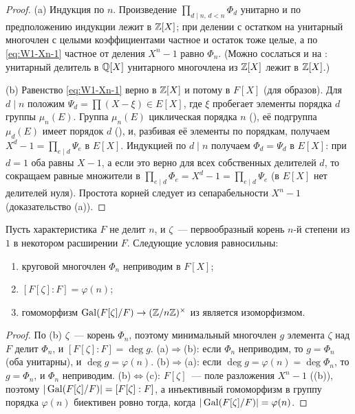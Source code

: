 \begin{proof}
(a) Индукция по $n$. Произведение $\prod_{d\mid n,\,d<n}\Phi_d$ унитарно и по предположению индукции лежит в $\mathbb Z[X]$; при
делении с остатком на унитарный многочлен с целыми коэффициентами частное и остаток тоже целые, а по \eqref{eq:W1-Xn-1}
частное от деления $X^n-1$ равно $\Phi_n$. (Можно сослаться и на : унитарный делитель в $\mathbb Q[X]$ унитарного многочлена из
$\mathbb Z[X]$ лежит в $\mathbb Z[X]$.)

(b) Равенство \eqref{eq:W1-Xn-1} верно в $\mathbb Z[X]$ и потому в $F[X]$ (для образов). Для $d\mid n$ положим
$\Psi_d=\prod(X-\xi)\in E[X]$, где $\xi$ пробегает элементы порядка $d$ группы $\mu_n(E)$. Группа $\mu_n(E)$ циклическая
порядка $n$ (), её подгруппа $\mu_d(E)$ имеет порядок $d$ (), и, разбивая её элементы по порядкам, получаем
$X^d-1=\prod_{e\mid d}\Psi_e$ в $E[X]$. Индукцией по $d\mid n$ получаем $\Phi_d=\Psi_d$ в $E[X]$: при $d=1$ оба равны $X-1$,
а если это верно для всех собственных делителей $d$, то сокращаем равные множители в
$\prod_{e\mid d}\Phi_e=X^d-1=\prod_{e\mid d}\Psi_e$ (в $E[X]$ нет делителей нуля). Простота корней следует из
сепарабельности $X^n-1$ (доказательство (a)).
\end{proof}

\begin{lemma}[5.9]
Пусть характеристика $F$ не делит $n$, и $\zeta$~--- первообразный корень $n$-й степени из $1$ в некотором расширении $F$.
Следующие условия равносильны:
\begin{enumerate}[label=\textup{(\alph*)}]
\item круговой многочлен $\Phi_n$ неприводим в $F[X]$;
\item $[F[\zeta]:F]=\varphi(n)$;
\item гомоморфизм $\operatorname{Gal}(F[\zeta]/F)\to(\mathbb Z/n\mathbb Z)^\times$ из  является изоморфизмом.
\end{enumerate}
\end{lemma}

\begin{proof}
По (b) $\zeta$~--- корень $\Phi_n$, поэтому минимальный многочлен $g$ элемента $\zeta$ над $F$ делит $\Phi_n$, и
$[F[\zeta]:F]=\deg g$. (a)$\Rightarrow$(b): если $\Phi_n$ неприводим, то $g=\Phi_n$ (оба унитарны), и $\deg g=\varphi(n)$.
(b)$\Rightarrow$(a): если $\deg g=\varphi(n)=\deg\Phi_n$, то $g=\Phi_n$, и $\Phi_n$ неприводим. (b)$\iff$(c): $F[\zeta]$~---
поле разложения $X^n-1$ ((b)), поэтому $|\operatorname{Gal}(F[\zeta]/F)|=[F[\zeta]:F]$, а инъективный гомоморфизм в группу порядка
$\varphi(n)$ биективен ровно тогда, когда $|\operatorname{Gal}(F[\zeta]/F)|=\varphi(n)$.
\end{proof}

